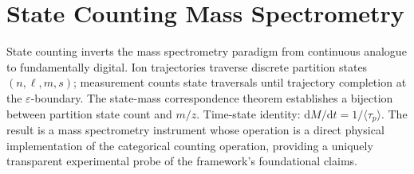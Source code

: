 \chapter{State Counting Mass Spectrometry}
\label{ch:state_counting}


\begin{chapterabstract}
State counting inverts the mass spectrometry paradigm from continuous analogue to fundamentally digital. Ion trajectories traverse discrete partition states $(n, \ell, m, s)$; measurement counts state traversals until trajectory completion at the $\varepsilon$-boundary. The state-mass correspondence theorem establishes a bijection between partition state count and $m/z$. Time-state identity: $\mathrm{d}M/\mathrm{d}t = 1/\langle\tau_p\rangle$. The result is a mass spectrometry instrument whose operation is a direct physical implementation of the categorical counting operation, providing a uniquely transparent experimental probe of the framework's foundational claims.
\end{chapterabstract}


